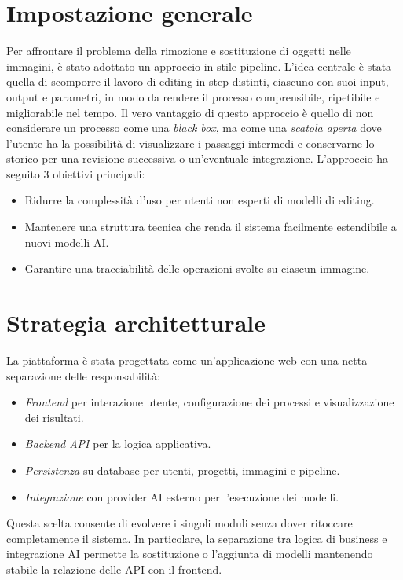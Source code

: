 \documentclass[oneside]{supsistudent}
\begin{document}
\section{Impostazione generale}
Per affrontare il problema della rimozione e sostituzione di oggetti nelle immagini, è stato adottato un approccio
in stile pipeline. \newline
L'idea centrale è stata quella di scomporre il lavoro di editing in step distinti, ciascuno con suoi input, output e parametri,
in modo da rendere il processo comprensibile, ripetibile e migliorabile nel tempo.
Il vero vantaggio di questo approccio è quello di non considerare un processo come una \emph{black box}, ma come
una \emph{scatola aperta} dove l'utente ha la possibilità di visualizzare i passaggi intermedi e conservarne lo storico
per una revisione successiva o un'eventuale integrazione. \newline \newline
L'approccio ha seguito 3 obiettivi principali:
\begin{itemize}
  \item Ridurre la complessità d'uso per utenti non esperti di modelli di editing.
  \item Mantenere una struttura tecnica che renda il sistema facilmente estendibile a nuovi modelli AI.
  \item Garantire una tracciabilità delle operazioni svolte su ciascun immagine.
\end{itemize}

\section{Strategia architetturale}
La piattaforma è stata progettata come un'applicazione web con una netta separazione delle responsabilità:
\begin{itemize}
  \item \emph{Frontend} per interazione utente, configurazione dei processi e visualizzazione dei risultati.
  \item \emph{Backend API} per la logica applicativa.
  \item \emph{Persistenza} su database per utenti, progetti, immagini e pipeline.
  \item \emph{Integrazione} con provider AI esterno per l'esecuzione dei modelli.
\end{itemize}
Questa scelta consente di evolvere i singoli moduli senza dover ritoccare completamente il sistema. In particolare,
la separazione tra logica di business e integrazione AI permette la sostituzione o l'aggiunta di modelli mantenendo
stabile la relazione delle API con il frontend.
\end{document}
